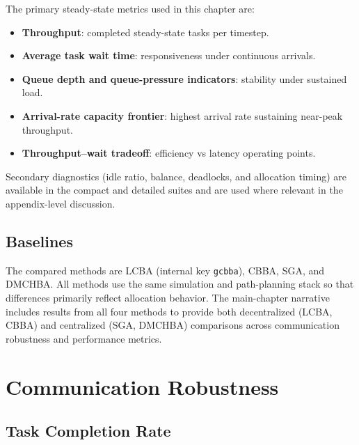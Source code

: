 The primary steady-state metrics used in this chapter are:
\begin{itemize}
  \item \textbf{Throughput}: completed steady-state tasks per timestep.
  \item \textbf{Average task wait time}: responsiveness under continuous arrivals.
  \item \textbf{Queue depth and queue-pressure indicators}: stability under sustained load.
  \item \textbf{Arrival-rate capacity frontier}: highest arrival rate sustaining near-peak throughput.
  \item \textbf{Throughput--wait tradeoff}: efficiency vs latency operating points.
\end{itemize}

Secondary diagnostics (idle ratio, balance, deadlocks, and allocation timing)
are available in the compact and detailed suites and are used where relevant in
the appendix-level discussion.


\subsection{Baselines}
\label{subsec:exp_baselines}

The compared methods are LCBA (internal key \texttt{gcbba}), CBBA, SGA,
and DMCHBA. All methods use the same simulation and path-planning stack so
that differences primarily reflect allocation behavior. The main-chapter narrative
includes results from all four methods to provide both decentralized (LCBA, CBBA)
and centralized (SGA, DMCHBA) comparisons across communication robustness and
performance metrics.


\section{Communication Robustness}
\label{sec:exp_comm_robustness}


\subsection{Task Completion Rate}
\label{subsec:exp_completion_rate}

